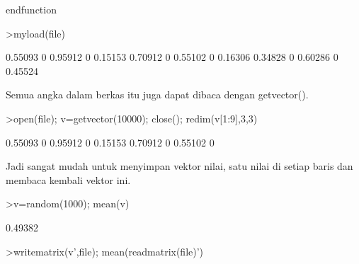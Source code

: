 \documentclass[a4paper,10pt]{article}
\begin{document}
\begin{eulernotebook}
\begin{eulercomment}
\begin{eulercomment}
\begin{eulercomment}
\begin{eulercomment}
\begin{eulercomment}
\begin{eulercomment}
\begin{eulercomment}
\begin{eulercomment}
\begin{eulercomment}
\begin{eulercomment}
\begin{eulercomment}
\begin{eulercomment}
\begin{eulercomment}
\begin{eulercomment}
\begin{eulercomment}
\begin{eulercomment}
\begin{eulercomment}
\begin{eulercomment}
\begin{eulercomment}
\begin{eulercomment}
\begin{eulercomment}
\begin{eulercomment}
\begin{eulercomment}
\begin{eulercomment}
\begin{eulercomment}
\begin{eulercomment}
\begin{eulercomment}
\begin{eulercomment}
\begin{eulercomment}
\begin{eulercomment}
\begin{eulercomment}
\begin{eulercomment}
\begin{eulercomment}
\begin{eulercomment}
\begin{eulercomment}
\begin{eulercomment}
\begin{eulercomment}
\begin{eulercomment}
\begin{eulercomment}
\begin{eulercomment}
\begin{eulercomment}
\begin{eulercomment}
\begin{eulercomment}
\begin{eulercomment}
\begin{eulercomment}
\begin{eulercomment}
\begin{eulercomment}
\begin{eulercomment}
\begin{eulercomment}
\begin{eulercomment}
\begin{eulercomment}
\begin{eulercomment}
\begin{eulercomment}
\begin{eulercomment}
\begin{eulercomment}
\begin{eulercomment}
\begin{eulercomment}
\begin{eulercomment}
\begin{eulercomment}
\begin{eulercomment}
\begin{eulercomment}
\begin{eulercomment}
\begin{eulercomment}
\begin{eulercomment}
\begin{eulercomment}
\begin{eulercomment}
\begin{eulercomment}
\begin{eulercomment}
\begin{eulercomment}
\begin{eulercomment}
\begin{eulerudf}
endfunction
\end{eulerudf}
\begin{eulerprompt}
>myload(file)
\end{eulerprompt}
\begin{euleroutput}
    0.55093         0   0.95912         0   0.15153 
    0.70912         0   0.55102         0   0.16306 
    0.34828         0   0.60286         0   0.45524 
\end{euleroutput}
\begin{eulercomment}
Semua angka dalam berkas itu juga dapat dibaca dengan getvector().
\end{eulercomment}
\begin{eulerprompt}
>open(file); v=getvector(10000); close(); redim(v[1:9],3,3)
\end{eulerprompt}
\begin{euleroutput}
    0.55093         0   0.95912 
          0   0.15153   0.70912 
          0   0.55102         0 
\end{euleroutput}
\begin{eulercomment}
Jadi sangat mudah untuk menyimpan vektor nilai, satu nilai di setiap
baris dan membaca kembali vektor ini.
\end{eulercomment}
\begin{eulerprompt}
>v=random(1000); mean(v)
\end{eulerprompt}
\begin{euleroutput}
  0.49382
\end{euleroutput}
\begin{eulerprompt}
>writematrix(v',file); mean(readmatrix(file)')
\end{eulerprompt}
\begin{euleroutput}
  
\end{euleroutput}
\end{eulercomment}
\end{eulercomment}
\end{eulercomment}
\end{eulercomment}
\end{eulercomment}
\end{eulercomment}
\end{eulercomment}
\end{eulercomment}
\end{eulercomment}
\end{eulercomment}
\end{eulercomment}
\end{eulercomment}
\end{eulercomment}
\end{eulercomment}
\end{eulercomment}
\end{eulercomment}
\end{eulercomment}
\end{eulercomment}
\end{eulercomment}
\end{eulercomment}
\end{eulercomment}
\end{eulercomment}
\end{eulercomment}
\end{eulercomment}
\end{eulercomment}
\end{eulercomment}
\end{eulercomment}
\end{eulercomment}
\end{eulercomment}
\end{eulercomment}
\end{eulercomment}
\end{eulercomment}
\end{eulercomment}
\end{eulercomment}
\end{eulercomment}
\end{eulercomment}
\end{eulercomment}
\end{eulercomment}
\end{eulercomment}
\end{eulercomment}
\end{eulercomment}
\end{eulercomment}
\end{eulercomment}
\end{eulercomment}
\end{eulercomment}
\end{eulercomment}
\end{eulercomment}
\end{eulercomment}
\end{eulercomment}
\end{eulercomment}
\end{eulercomment}
\end{eulercomment}
\end{eulercomment}
\end{eulercomment}
\end{eulercomment}
\end{eulercomment}
\end{eulercomment}
\end{eulercomment}
\end{eulercomment}
\end{eulercomment}
\end{eulercomment}
\end{eulercomment}
\end{eulercomment}
\end{eulercomment}
\end{eulercomment}
\end{eulercomment}
\end{eulercomment}
\end{eulercomment}
\end{eulercomment}
\end{eulercomment}
\end{eulernotebook}
\end{document}
